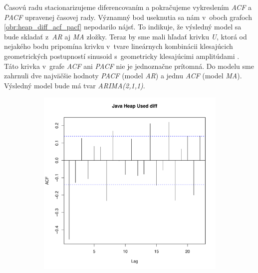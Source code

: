\documentclass[12pt,a4paper,oneside,final]{article}
\theoremstyle{definition}
\theoremstyle{remark}
\numberwithin{equation}{section}
\begin{document}
Časovú radu stacionarizujeme diferencovaním a pokračujeme vykreslením \emph{ACF} a
\emph{PACF} upravenej časovej rady. 
Významný bod useknutia sa nám v~oboch grafoch \ref{obr:heap_diff_acf_pacf} nepodarilo nájsť. 
To indikuje, že výsledný 
model sa bude skladať z~\emph{AR} aj \emph{MA} zložky. Teraz by sme mali hľadať krivku 
\emph{U}, ktorá od nejakého bodu pripomína krivku v~tvare lineárnych kombinácii klesajúcich
geometrických postupností sinusoid s~geometricky klesajúcimi amplitúdami \cite{cipra}.
Táto krivka v~grafe \emph{ACF} ani \emph{PACF} nie je jednoznačne prítomná. Do modelu sme zahrnuli dve najväčšie 
hodnoty \emph{PACF} (model \emph{AR}) a jednu \emph{ACF} (model \emph{MA}).
Výsledný model bude má tvar \emph{ARIMA(2,1,1)}.

\begin{figure}[H] \centering
    \begin{subfigure}[b]{0.45\textwidth}
        \centering
        \includegraphics[width=1\linewidth]{images/heap_diff_acf.pdf}
    \end{subfigure}
    \begin{subfigure}[b]{0.45\textwidth}
        \centering

\end{subfigure}
\end{figure}
\end{document}
